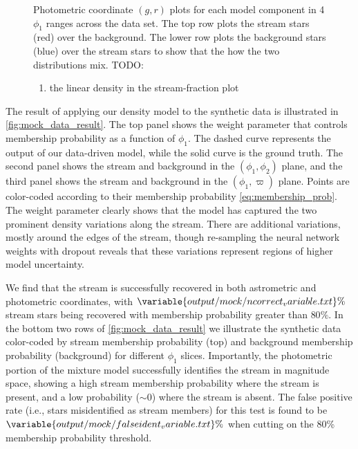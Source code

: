 \documentclass[twocolumn]{aastex631}
\newcommand{\parallax}{\varpi}
\begin{document}
\begin{figure}
{                    Photometric coordinate $(g, r)$ plots for each model component
                    in 4 $\phi_1$ ranges across the data set. The top row plots the
                    stream stars (red) over the background. The lower row plots the
                    background stars (blue) over the stream stars to show that the
                    how the two distributions mix.
            }
            \label{fig:mock_data_result}
            TODO:
            \begin{enumerate}
                \item the linear density in the stream-fraction plot
            \end{enumerate}
        \end{figure}
    
        The result of applying our density model to the synthetic data is
        illustrated in \autoref{fig:mock_data_result}. The top panel shows the
        weight parameter that controls membership probability as a function of
        $\phi_1$. The dashed curve represents the output of our data-driven model,
        while the solid curve is the ground truth. The second panel shows the stream
        and background in the $(\phi_1,\phi_2)$ plane, and the third panel shows the
        stream and background in the $(\phi_1,\parallax)$ plane. Points are
        color-coded according to their membership probability
        \autoref{eq:membership_prob}. The weight parameter clearly shows that the
        model has captured the two prominent density variations along the stream.
        There are additional variations, mostly around the edges of the stream, though
        re-sampling the neural network weights with dropout reveals that these
        variations represent regions of higher model uncertainty. 
    
        We find that the stream is successfully recovered in both astrometric and
        photometric coordinates, with $\variable{output/mock/ncorrect_variable.txt}\%$ stream
        stars being recovered with membership probability greater than $80\%$.
        In the bottom two rows of \autoref{fig:mock_data_result} we illustrate the
        synthetic data color-coded by stream membership probability (top) and
        background membership probability (background) for different $\phi_1$
        slices. Importantly, the photometric portion of the mixture model
        successfully identifies the stream in magnitude space, showing a high stream
        membership probability where the stream is present, and a low probability
        ($\sim 0$) where the stream is absent.
        The false positive rate (i.e., stars misidentified as stream members) for this test
        is found to be $\variable{output/mock/falseident_variable.txt}\%$ when cutting on
        the 80\% membership probability threshold.
    
\end{document}
